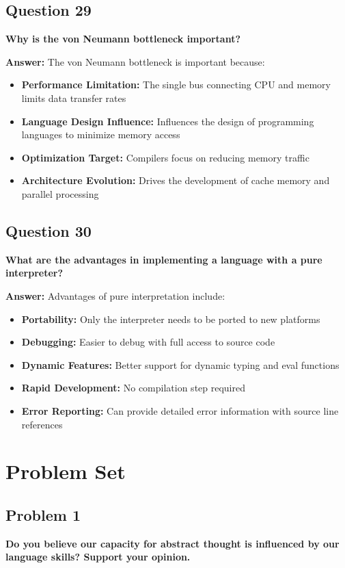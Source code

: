 \documentclass[11pt,a4paper]{article}
\begin{document}
\subsection{Question 29}
\textbf{Why is the von Neumann bottleneck important?}

\textbf{Answer:}
The von Neumann bottleneck is important because:

\begin{itemize}
\item \textbf{Performance Limitation:} The single bus connecting CPU and memory limits data transfer rates
\item \textbf{Language Design Influence:} Influences the design of programming languages to minimize memory access
\item \textbf{Optimization Target:} Compilers focus on reducing memory traffic
\item \textbf{Architecture Evolution:} Drives the development of cache memory and parallel processing
\end{itemize}

\subsection{Question 30}
\textbf{What are the advantages in implementing a language with a pure interpreter?}

\textbf{Answer:}
Advantages of pure interpretation include:

\begin{itemize}
\item \textbf{Portability:} Only the interpreter needs to be ported to new platforms
\item \textbf{Debugging:} Easier to debug with full access to source code
\item \textbf{Dynamic Features:} Better support for dynamic typing and eval functions
\item \textbf{Rapid Development:} No compilation step required
\item \textbf{Error Reporting:} Can provide detailed error information with source line references
\end{itemize}

\section{Problem Set}

\subsection{Problem 1}
\textbf{Do you believe our capacity for abstract thought is influenced by our language skills? Support your opinion.}
\end{document}
